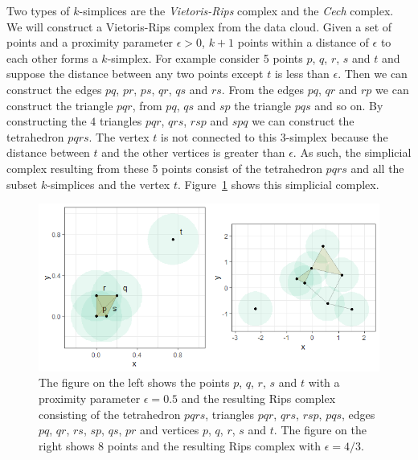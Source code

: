 \documentclass[letter,12pt]{article}
\begin{document}
Two types of $k$-simplices are the \textit{Vietoris-Rips} complex and the \textit{Cech} complex. We will construct a Vietoris-Rips complex from the data cloud. Given a set of points and a proximity parameter $\epsilon > 0$, $k+1$ points within a distance of $\epsilon$ to each other forms a $k$-simplex.  For example consider 5 points $p$, $q$, $r$, $s$ and $t$ and suppose the distance between any two points except $t$ is less than $\epsilon$. Then we can construct the edges $pq$, $pr$, $ps$, $qr$, $qs$ and $rs$. From the edges $pq$, $qr$ and $rp$ we can construct the triangle $pqr$, from $pq$, $qs$ and $sp$ the triangle $pqs$ and so on. By constructing the $4$ triangles $pqr$, $qrs$, $rsp$ and $spq$ we can construct the tetrahedron $pqrs$. The vertex $t$ is not connected to this $3$-simplex because the distance between $t$ and the other vertices is greater than $\epsilon$. As such, the simplicial complex resulting from these 5 points consist of the tetrahedron $pqrs$ and all the subset $k$-simplices and the vertex $t$. Figure~\ref{fig:tetrahedron} shows this simplicial complex. 

\begin{figure}
    \centering
    \includegraphics[scale=0.8]{simplicial_complex.png}
    \caption{The figure on the left shows the points $p$, $q$, $r$, $s$ and $t$ with a proximity parameter $\epsilon = 0.5$ and the resulting Rips complex consisting of the tetrahedron $pqrs$, triangles $pqr$, $qrs$, $rsp$,  $pqs$, edges $pq$, $qr$, $rs$, $sp$, $qs$, $pr$ and vertices $p$, $q$, $r$, $s$ and $t$. The figure on the right shows $8$ points and the resulting Rips complex with $\epsilon=4/3$.}
    \label{fig:tetrahedron}
\end{figure}
\end{document}
